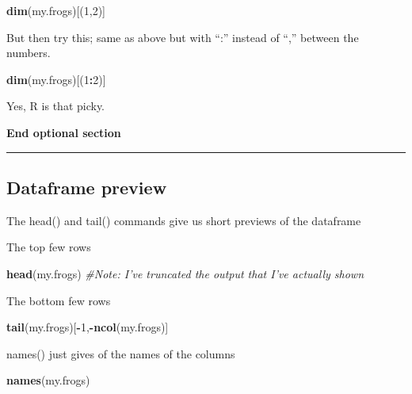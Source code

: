 \documentclass[]{book}
\newenvironment{Shaded}{\begin{snugshade}}{\end{snugshade}}
\newcommand{\KeywordTok}[1]{\textcolor[rgb]{0.13,0.29,0.53}{\textbf{#1}}}
\newcommand{\DecValTok}[1]{\textcolor[rgb]{0.00,0.00,0.81}{#1}}
\newcommand{\CommentTok}[1]{\textcolor[rgb]{0.56,0.35,0.01}{\textit{#1}}}
\newcommand{\OperatorTok}[1]{\textcolor[rgb]{0.81,0.36,0.00}{\textbf{#1}}}
\newcommand{\NormalTok}[1]{#1}
\theoremstyle{definition}
\theoremstyle{definition}
\theoremstyle{definition}
\theoremstyle{remark}
\begin{document}
\begin{Shaded}
\begin{Highlighting}[]
\KeywordTok{dim}\NormalTok{(my.frogs)[(}\DecValTok{1}\NormalTok{,}\DecValTok{2}\NormalTok{)]}
\end{Highlighting}
\end{Shaded}

But then try this; same as above but with ``:'' instead of ``,'' between
the numbers.

\begin{Shaded}
\begin{Highlighting}[]
\KeywordTok{dim}\NormalTok{(my.frogs)[(}\DecValTok{1}\OperatorTok{:}\DecValTok{2}\NormalTok{)]}
\end{Highlighting}
\end{Shaded}

Yes, R is that picky.

\textbf{End optional section}

\begin{center}\rule{0.5\linewidth}{\linethickness}\end{center}

\subsection{Dataframe preview}\label{dataframe-preview}

The head() and tail() commands give us short previews of the dataframe

The top few rows

\begin{Shaded}
\begin{Highlighting}[]
\KeywordTok{head}\NormalTok{(my.frogs) }\CommentTok{#Note: I've truncated the output that I've actually shown}
\end{Highlighting}
\end{Shaded}

The bottom few rows

\begin{Shaded}
\begin{Highlighting}[]
\KeywordTok{tail}\NormalTok{(my.frogs)[}\OperatorTok{-}\DecValTok{1}\NormalTok{,}\OperatorTok{-}\KeywordTok{ncol}\NormalTok{(my.frogs)]}
\end{Highlighting}
\end{Shaded}

names() just gives of the names of the columns

\begin{Shaded}
\begin{Highlighting}[]
\KeywordTok{names}\NormalTok{(my.frogs)}
\end{Highlighting}
\end{Shaded}
\end{document}
